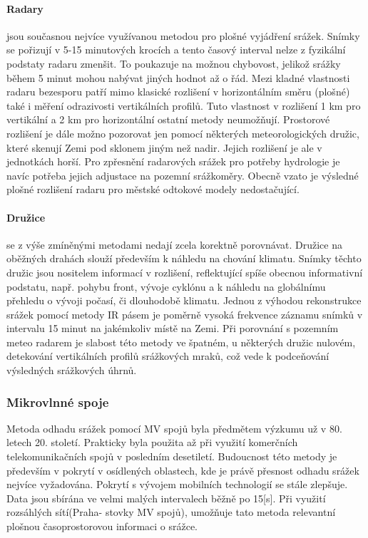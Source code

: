 \documentclass[a4paper,12pt]{report}
\begin{document}
\paragraph*{Radary}
jsou současnou nejvíce využívanou metodou pro plošné vyjádření srážek. Snímky se pořizují v 5-15 minutových krocích a tento časový interval nelze z fyzikální podstaty radaru zmenšit. To poukazuje na možnou chybovost, jelikož srážky během 5 minut mohou nabývat jiných hodnot až o řád. Mezi kladné vlastnosti radaru bezesporu patří mimo klasické rozlišení v horizontálním směru (plošné) také i měření odrazivosti vertikálních profilů. Tuto vlastnost v rozlišení 1 km pro vertikální a 2 km pro horizontální ostatní metody neumožňují. Prostorové rozlišení je dále možno pozorovat jen pomocí některých meteorologických družic, které skenují Zemi pod sklonem jiným než nadir. Jejich rozlišení je ale v jednotkách horší. Pro zpřesnění radarových srážek pro potřeby hydrologie je navíc potřeba jejich adjustace na pozemní srážkoměry. Obecně vzato je výsledné plošné rozlišení radaru pro městské odtokové modely nedostačující.   

\paragraph*{Družice} se z výše zmíněnými metodami nedají zcela korektně porovnávat. Družice na oběžných drahách slouží především k náhledu na chování klimatu. Snímky těchto družic jsou nositelem informací v rozlišení, reflektující spíše obecnou informativní podstatu, např. pohybu front, vývoje cyklónu a k náhledu na globálnímu přehledu o vývoji počasí, či dlouhodobě klimatu.
Jednou z výhodou rekonstrukce srážek pomocí metody \acs{IR} pásem je poměrně vysoká frekvence záznamu snímků v intervalu 15 minut na jakémkoliv místě na Zemi. Při porovnání s pozemním meteo radarem je slabost této metody ve špatném, u některých družic nulovém, detekování vertikálních profilů srážkových mraků, což vede k podceňování výsledných srážkových úhrnů.


\subsubsection{Mikrovlnné spoje}
Metoda odhadu srážek pomocí MV spojů byla předmětem výzkumu už v 80. letech 20. století. Prakticky byla použita až při využití komerčních telekomunikačních spojů v posledním desetiletí. Budoucnost této metody je především v pokrytí v osídlených oblastech, kde je právě přesnost odhadu srážek nejvíce vyžadována. Pokrytí s vývojem mobilních technologií se stále zlepšuje. Data jsou sbírána ve velmi malých intervalech běžně po 15[s]. Při využití rozsáhlých sítí(Praha- stovky MV spojů), umožňuje tato metoda relevantní plošnou časoprostorovou informaci o srážce.
 
\end{document}
